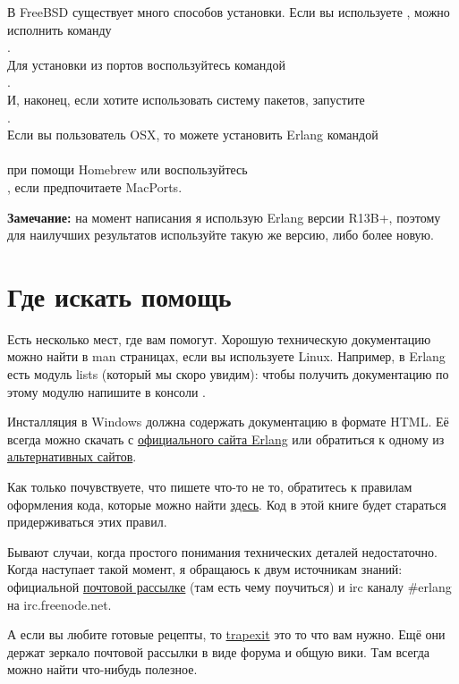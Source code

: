 В FreeBSD существует много способов установки.
Если вы используете , можно исполнить команду\\ 
.\\ 
Для установки из портов воспользуйтесь командой\\ 
.\\ 
И, наконец, если хотите использовать систему пакетов, запустите\\  
.\\ 
Если вы пользователь OSX, то можете установить Erlang командой\\ 
\\ 
при помощи Homebrew или воспользуйтесь\\ 
, если предпочитаете MacPorts.\\ 
\colorbox{lgray}
{
\begin{minipage}{1.0\linewidth}
\textbf{Замечание:} на момент написания я использую Erlang версии R13B+, поэтому для наилучших результатов используйте такую же версию, либо более новую.
\end{minipage}
}
\section{Где искать помощь}
Есть несколько мест, где вам помогут.
Хорошую техническую документацию можно найти в man страницах, если вы используете Linux.
Например, в Erlang есть модуль lists (который мы скоро увидим): чтобы получить документацию по этому модулю напишите в консоли .

Инсталляция в Windows должна содержать документацию в формате HTML.
Её всегда можно скачать с \href{http://erlang.org/doc/}{официального сайта Erlang} или обратиться к одному из \href{http://erldocs.com}{альтернативных сайтов}.

Как только почувствуете, что пишете что\--то не то, обратитесь к правилам оформления кода, которые можно найти \href{http://www.erlang.se/doc/programming_rules.shtml}{здесь}.
Код в этой книге будет стараться придерживаться этих правил.

Бывают случаи, когда простого понимания технических деталей недостаточно.
Когда наступает такой момент, я обращаюсь к двум источникам знаний: официальной \href{http://www.erlang.org/static/doc/mailinglist.html}{почтовой рассылке} (там есть чему поучиться) и irc каналу \#erlang на irc.freenode.net.

А если вы любите готовые рецепты, то \href{http://trapexit.org}{trapexit} это то что вам нужно.
Ещё они держат зеркало почтовой рассылки в виде форума и общую вики.
Там всегда можно найти что\--нибудь полезное.
